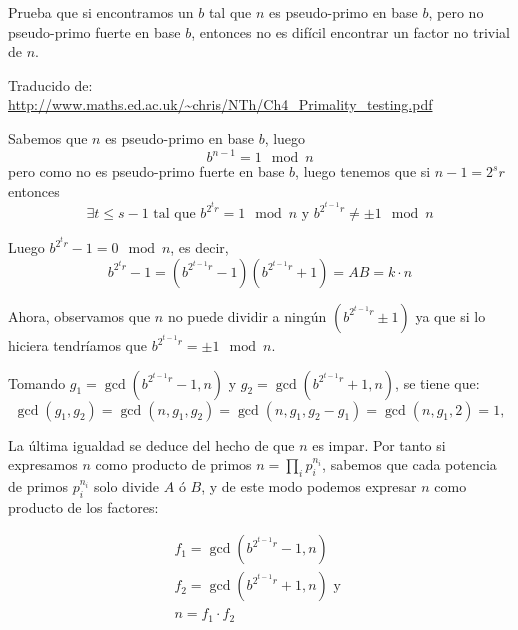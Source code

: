 \begin{problem}[18]
Prueba que si encontramos un $b$ tal que $n$ es pseudo-primo en base
$b$, pero no pseudo-primo fuerte en base $b$, entonces no es
difícil encontrar un factor no trivial de $n$.
\solution
{}


Traducido de: \url{http://www.maths.ed.ac.uk/~chris/NTh/Ch4_Primality_testing.pdf}

Sabemos que $n$ es pseudo-primo en base $b$, luego
\[b^{n-1} = 1 \mod n\]
pero como no es pseudo-primo fuerte en base $b$, luego tenemos que si $n-1=2^{s}r$ entonces
\[\exists t\leq s-1 \text{ tal que } b^{2^{t}r} = 1 \mod n \text{ y } b^{2^{t-1}r} \neq \pm 1 \mod n\]

Luego $b^{2^{t}r} - 1 = 0 \mod n$, es decir,
\[b^{2^{t}r} - 1 = (b^{2^{t-1}r} - 1) (b^{2^{t-1}r} + 1) = AB = k \cdot n\]

Ahora, observamos que $n$ no puede dividir a ningún $(b^{2^{t-1}r} \pm 1)$ ya que si lo hiciera tendríamos que $b^{2^{t-1}r} = \pm 1 \mod n$.

Tomando $g_1 = \gcd(b^{2^{t−1}r}-1, n)$ y $g_2 = \gcd(b^{2^{t−1}r}+1, n)$, se tiene que:
\[\gcd(g_1, g_2) = \gcd(n, g_1, g_2) = \gcd(n, g_1, g_2 − g_1) = \gcd(n, g_1, 2) = 1,\]

La última igualdad se deduce del hecho de que $n$ es impar. Por tanto si expresamos $n$ como producto de primos $n = \prod_i p_i^{n_i}$, sabemos que cada potencia de primos $p_i^{n_i}$ solo divide $A$ ó $B$, y de este modo podemos expresar $n$ como producto de los factores:

\begin{gather*}
f_1 = \gcd(b^{2^{t-1}r} - 1,n)\\
f_2 = \gcd(b^{2^{t-1}r} + 1,n) \text{ y }\\
n = f_1 \cdot f_2
\end{gather*}


\end{problem}

